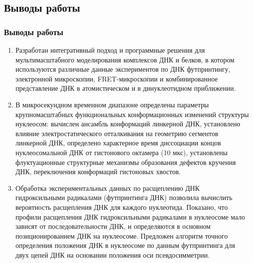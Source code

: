 \subsection{Выводы работы}
\begin{frame}%
    \frametitle{Выводы работы}

\begin{enumerate}
\justifying
\scriptsize
\item Разработан интегративный подход и программные решения для мультимасштабного моделирования комплексов ДНК и белков, в котором используются различные данные экспериментов по ДНК футпринтингу, электронной микроскопии, FRET-микроскопии и комбинированное представление ДНК в атомистическом и в динуклеотидном приближении.



  \item В микросекундном временном диапазоне определены параметры крупномасштабных функциональных конформационных изменений структуры нуклеосом: вычислен ансамбль конформаций линкерной ДНК, установлено влияние электростатического отталкивания на геометрию сегментов линкерной ДНК, определено характерное время диссоциации концов нуклеосомальной ДНК от гистонового октамера (10 мкс), установлены флуктуационные структурные механизмы образования дефектов кручения ДНК, переключения конформаций гистоновых хвостов.



  \item Обработка экспериментальных данных по расщеплению ДНК гидроксильными радикалами (футпринтинга ДНК) позволила вычислить вероятность расщепления ДНК для каждого нуклеотида. Показано, что профили расщепления ДНК гидроксильными радикалами в нуклеосоме мало зависят от последовательности ДНК, и определяются в основном позиционированием ДНК на нуклеосоме. Предложен алгоритм точного определения положения ДНК в нуклеосоме по данным футпринтинга для двух цепей ДНК на основании положения оси псевдосимметрии.

\end{enumerate}
\end{frame}

